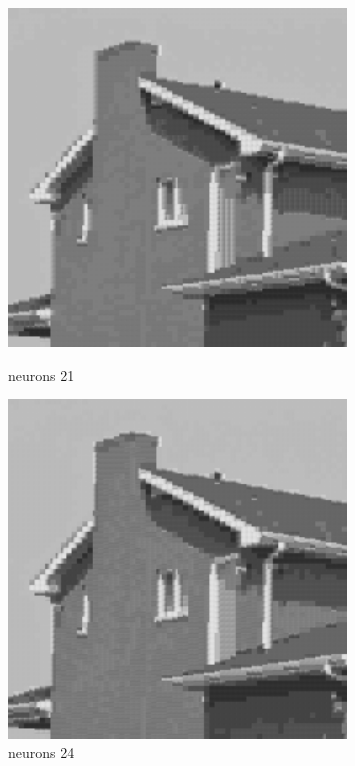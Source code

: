 \documentclass[../IDP_Task5_Karwowski_Kowalewski.tex]{subfiles}
\begin{document}
{{        \begin{figure}[!htbp]
            \begin{minipage}[c]{0.45\linewidth}
                \centering
                \includegraphics[width=0.8\textwidth]{img/kowalewski/crop_size_4_neurons_21.png}
                \caption{neurons 21}
            \end{minipage}\hfill
            \begin{minipage}[c]{0.45\linewidth}
                \centering
                \includegraphics[width=0.8\textwidth]{img/kowalewski/crop_size_4_neurons_24.png}
                \caption{neurons 24}
            \end{minipage}
        \end{figure}

}}
\end{document}

